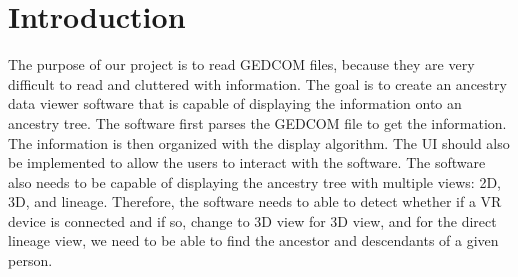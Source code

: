 \documentclass[onecolumn, draftclsnofoot, 10pt, compsoc]{IEEEtran}
\begin{document}
\section{Introduction }
\begin{singlespace}
The purpose of our project is to read GEDCOM files, because they are very difficult to read and cluttered with information. The goal is to create an ancestry data viewer software that is capable of displaying the information onto an ancestry tree. The software first parses the GEDCOM file to get the information. The information is then organized with the display algorithm. The UI should also be implemented to allow the users to interact with the software. The software also needs to be capable of displaying the ancestry tree with multiple views: 2D, 3D, and lineage. Therefore, the software needs to able to detect whether if a VR device is connected and if so, change to 3D view for 3D view, and for the direct lineage view, we need to be able to find the ancestor and descendants of a given person.
\end{singlespace}
\end{document}
